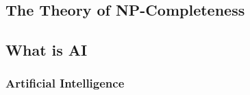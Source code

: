 


\begin{bibunit}

\chapter{The Theory of NP-Completeness}
\label{chap:NPC}



% 
% 
\section{What is AI}
\label{intro:sec:what_is_ai}
% 
% 
\subsection{Artificial Intelligence}
\label{sec:artificial_intelligence}



\renewcommand{\bibsection}{\section{\bibname}}
\putbib
\end{bibunit}
